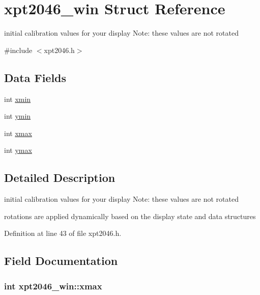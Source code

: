 \hypertarget{structxpt2046__win}{}\section{xpt2046\+\_\+win Struct Reference}
\label{structxpt2046__win}


initial calibration values for your display Note\+: these values are not rotated  




{\ttfamily \#include $<$xpt2046.\+h$>$}

\subsection*{Data Fields}
\begin{DoxyCompactItemize}
\item 
int \hyperlink{structxpt2046__win_a83246592b12a936f334cea8f3374eafc}{xmin}
\item 
int \hyperlink{structxpt2046__win_a8a6c2bee978d86317e06b8bb41a65d7c}{ymin}
\item 
int \hyperlink{structxpt2046__win_a302357cc74ea4a1a532c51548b699e0e}{xmax}
\item 
int \hyperlink{structxpt2046__win_ad5cfee0de6f30ce141b93b0aec904376}{ymax}
\end{DoxyCompactItemize}


\subsection{Detailed Description}
initial calibration values for your display Note\+: these values are not rotated 


\begin{DoxyItemize}
\item rotations are applied dynamically based on the display state and data structures 
\end{DoxyItemize}

Definition at line 43 of file xpt2046.\+h.



\subsection{Field Documentation}
\subsubsection[{\texorpdfstring{xmax}{xmax}}]{\setlength{\rightskip}{0pt plus 5cm}int xpt2046\+\_\+win\+::xmax}\hypertarget{structxpt2046__win_a302357cc74ea4a1a532c51548b699e0e}{}\label{structxpt2046__win_a302357cc74ea4a1a532c51548b699e0e}


